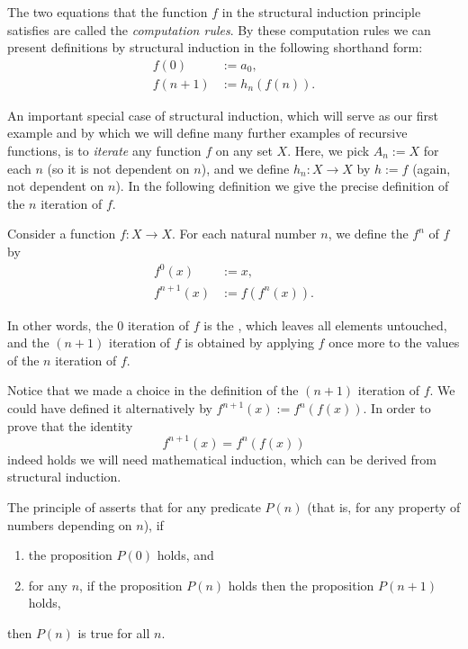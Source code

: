 The two equations that the function $f$ in the structural induction principle satisfies are called the \emph{computation rules}. By these computation rules we can present definitions by structural induction in the following shorthand form:
\begin{align*}
  f(0) & := a_0, \\
  f(n+1) & := h_n(f(n)).
\end{align*}

An important special case of structural induction, which will serve as our first example and by which we will define many further examples of recursive functions, is to \emph{iterate} any function $f$ on any set $X$. Here, we pick $A_n:= X$ for each $n$ (so it is not dependent on $n$), and we define $h_n:X\to X$ by $h:=f$ (again, not dependent on $n$). In the following definition we give the precise definition of the $n$\supth{} iteration of $f$.

\begin{definition}
  Consider a function $f:X\to X$. For each natural number $n$, we define the  $f^n$ of $f$ by
  \begin{align*}
    f^0(x) & := x, \\
    f^{n+1}(x) & := f(f^n(x)). 
  \end{align*}  
\end{definition}

In other words, the $0$\supth{} iteration of $f$ is the , which leaves all elements untouched, and the $(n+1)$\supst{} iteration of $f$ is obtained by applying $f$ once more to the values of the $n$\supth{} iteration of $f$.

\begin{remark}\label{remark:alternative-iteration}
  Notice that we made a choice in the definition of the $(n+1)$\supst{} iteration of $f$. We could have defined it alternatively by $f^{n+1}(x):=f^n(f(x))$. In order to prove that the identity
  \begin{equation*}
    f^{n+1}(x)=f^n(f(x))
  \end{equation*}
  indeed holds we will need mathematical induction, which can be derived from structural induction.  
\end{remark}

\begin{definition}
  The principle of  asserts that for any predicate $P(n)$ (that is, for any property of numbers depending on $n$), if
  \begin{enumerate}
  \item the proposition $P(0)$ holds, and
  \item for any $n$, if the proposition $P(n)$ holds then the proposition $P(n+1)$ holds,
  \end{enumerate}
  then $P(n)$ is true for all $n$.
\end{definition}

